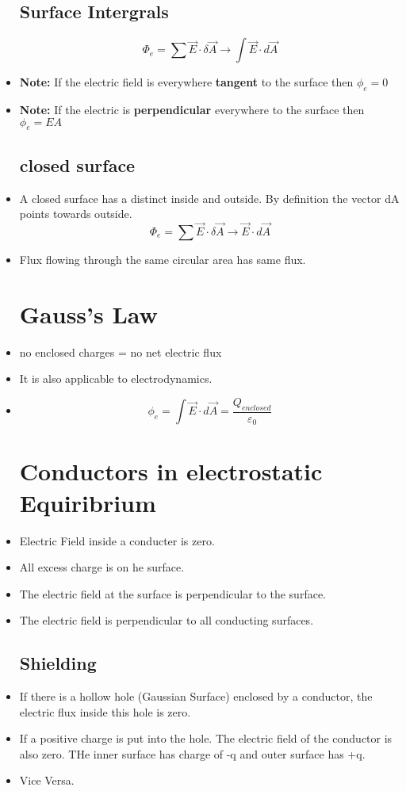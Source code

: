 \documentclass[12pt]{article}
\begin{document}
\begin{itemize}
\subsection{Surface Intergrals}
\begin{displaymath}
\Phi_e= \sum  \vec{E} \cdot \delta  \vec{A} \longrightarrow \int \vec{E} \cdot d \vec{A}
\end{displaymath}
\item \textbf{Note:} If the electric field is everywhere \textbf{tangent} to the surface then $\phi_e =0$
\item \textbf{Note:} If the electric is \textbf{perpendicular} everywhere to the surface then $\phi_e=EA$
\subsection{closed surface}
\item A closed surface has a distinct inside and outside. By definition the vector dA points towards outside.
\begin{displaymath}
\Phi_e= \sum  \vec{E} \cdot \delta  \vec{A} \longrightarrow  \vec{E} \cdot d \vec{A}
\end{displaymath}
\item Flux flowing through the same circular area has same flux.

\pagebreak
\section{Gauss's Law}
\item no enclosed charges = no net electric flux
\item It is also applicable to electrodynamics.
\item
\begin{displaymath}
\phi_e= \int \vec{E} \cdot d \vec{A} = \frac{Q_{enclosed}}{\varepsilon_0}
\end{displaymath}
\section{Conductors in electrostatic Equiribrium}
\item Electric Field inside a conducter is zero. 
\item All excess charge is on he surface.  
\item The electric field at the surface is perpendicular to the surface.
\item The electric field is perpendicular to all conducting surfaces.
\subsection{Shielding}
\item If there is a hollow hole (Gaussian Surface) enclosed by a conductor, the electric flux inside this hole is zero. 
\item If a positive charge is put into the hole. The electric field of the conductor is also zero. THe inner surface has charge of -q and outer surface has +q.
\item Vice Versa.
\end{itemize}
\end{document}
